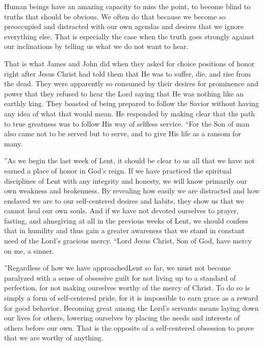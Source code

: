 \documentclass[twoside, letterpaper, 12pt]{report}
\begin{document}
\begin{maybetwocolumns}

Human beings have an amazing capacity to miss the point,
to become blind to truths that should be obvious. 
We often do that because we become so preoccupied and distracted with our own agendas
and desires that we ignore everything else.
That is especially the case when the truth goes strongly against our inclinations by
telling us what we do not want to hear.

That is what James and John did when they asked for choice positions of honor right after
Jesus Christ had told them that He was to suffer, die, and rise from the dead.
They were apparently so consumed by their desires for prominence and power that they
refused to hear the Lord saying that He was nothing like an earthly king.
They boasted of being prepared to follow the Savior without having any idea of what that
would mean.
He responded by making clear that the path to true greatness was to follow His way of
selfless service. “For the Son of man also came not to be served but to serve,
and to give His life as a ransom for many.

”As we begin the last week of Lent,
it should be clear to us all that we have not earned a place of honor in God’s reign.
If we have practiced the spiritual disciplines of Lent with any integrity and honesty,
we will know primarily our own weakness and brokenness.
By revealing how easily we are distracted and how enslaved we are to our
self-centered desires and habits, they show us that we cannot heal our own souls.
And if we have not devoted ourselves to prayer, fasting, 
and almsgiving at all in the previous weeks of Lent,
we should confess that in humility and thus gain a greater awareness that we stand in
constant need of the Lord’s gracious mercy.
“Lord Jesus Christ, Son of God, have mercy on me, a sinner.

”Regardless of how we have approachedLent so far,
we must not become paralyzed with a sense of obsessive guilt for not living up to a
standard of perfection, for not making ourselves worthy of the mercy of Christ.
To do so is simply a form of self-centered pride,
for it is impossible to earn grace as a reward for good behavior.
Becoming great among the Lord’s servants means laying down our lives for others,
lowering ourselves by placing the needs and interests of others before our own.
That is the opposite of a self-centered obsession to prove that we are worthy of anything.


\end{maybetwocolumns}
\end{document}
